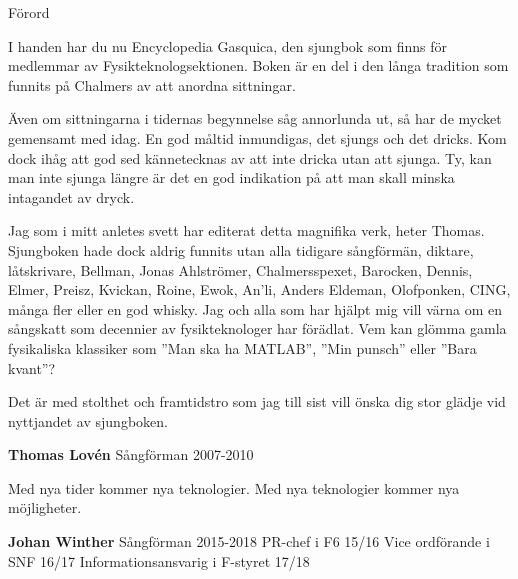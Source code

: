 \begin{flushleft}
{\Huge Förord\\}
\end{flushleft}

{\large
I handen har du nu Encyclopedia Gasquica, den sjungbok som finns för medlemmar av Fysikteknologsektionen.
Boken är en del i den långa tradition som funnits på Chalmers av att anordna sittningar.

Även om sittningarna i tidernas begynnelse såg annorlunda ut, så har de mycket gemensamt med idag.
En god måltid inmundigas, det sjungs och det dricks.
Kom dock ihåg att god sed kännetecknas av att inte dricka utan att sjunga.
Ty, kan man inte sjunga längre är det en god indikation på att man skall minska intagandet av dryck.

Jag som i mitt anletes svett har editerat detta magnifika verk, heter Thomas.
Sjungboken hade dock aldrig funnits utan alla tidigare sångförmän, diktare, låtskrivare, Bellman, Jonas Ahlströmer, Chalmersspexet, Barocken,
Dennis, Elmer, Preisz, Kvickan, Roine, Ewok, An'li, Anders Eldeman, Olofponken, CING, många fler eller en god whisky.
Jag och alla som har hjälpt mig vill värna om en sångskatt som decennier av fysikteknologer har förädlat.
Vem kan glömma gamla fysikaliska klassiker som ''Man ska ha MATLAB'', ''Min punsch'' eller ''Bara kvant''?

Det är med stolthet och framtidstro som jag till sist vill önska dig stor glädje vid nyttjandet av sjungboken.

\vspace{0.5cm}
\begin{flushright}
\textbf{Thomas Lovén}
Sångförman 2007-2010
\end{flushright}
}

\newpage

{\large
Med nya tider kommer nya teknologier.
Med nya teknologier kommer nya möjligheter.

\vspace{0.5cm}
\begin{flushright}
\textbf{Johan Winther}
Sångförman 2015-2018
PR-chef i F6 15/16
Vice ordförande i SNF 16/17
Informationsansvarig i F-styret 17/18
\end{flushright}
}

\newpage

